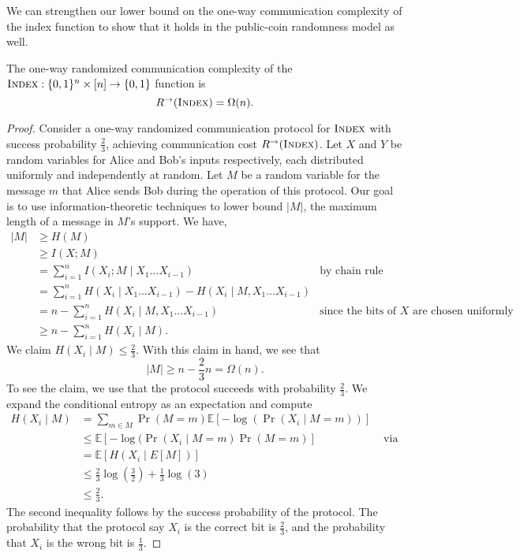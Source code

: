 We can strengthen our lower bound on the one-way communication complexity of the index function to show that it holds in the public-coin randomness model as well.

\begin{theorem}
The one-way randomized communication complexity of the $\textsc{Index} : \{0,1\}^n \times [n] \to \{0,1\}$ function is
\[
R^\rightarrow(\textsc{Index}) = \Omega(n).
\]
\end{theorem}

\begin{proof}
Consider a one-way randomized communication protocol for $\textsc{Index}$ with success probability $\frac{2}{3}$, achieving communication cost $R^\rightarrow(\textsc{Index})$. Let $X$ and $Y$ be random variables for Alice and Bob's inputs respectively, each distributed uniformly and independently at random. Let $M$ be a random variable for the message $m$ that Alice sends Bob during the operation of this protocol. Our goal is to use information-theoretic techniques to lower bound $|M|$, the maximum length of a message in $M$'s support. We have,
\begin{align*}
|M| &\geq H(M)\\
&\geq I(X;M) \\
&=\sum_{i=1}^n I(X_i; M \mid X_1\dots X_{i-1}) &\text{by chain rule} \\
&=\sum_{i=1}^n H(X_i\mid X_1\dots X_{i-1}) - H(X_i\mid M, X_1\dots X_{i-1})\\
&= n - \sum_{i=1}^n H(X_i\mid M, X_1\dots X_{i-1}) &\text{since the bits of $X$ are chosen uniformly independently} \\
&\geq n-\sum_{i=1}^n H(X_i\mid M).
\end{align*} 
We claim $H(X_i\mid M)\leq \frac{2}{3}$. With this claim in hand, we see that
$$|M| \geq n-\frac{2}{3}n =\Omega(n).$$
To see the claim, we use that the protocol succeeds with probability $\frac{2}{3}$. We expand the conditional entropy as an expectation and compute
\begin{align*}
	H(X_i\mid M) &= \sum_{m \in M} \Pr(M=m)\mathbb{E}[-\log(\Pr(X_i\mid M=m))]\\
	&\leq \mathbb{E}[-\log(\Pr(X_i\mid M=m)\Pr(M=m)] &\text{ via Jensen's inequality}\\
	&= \mathbb{E}[H(X_i\mid E[M])]\\
	&\leq \frac{2}{3}\log\left(\frac{3}{2}\right) + \frac{1}{3}\log(3)\\
	&\leq \frac{2}{3}.
\end{align*}
The second inequality follows by the success probability of the protocol. The probability that the protocol say $X_i$ is the correct bit is $\frac{2}{3}$, and the probability that $X_i$ is the wrong bit is $\frac{1}{3}$.
\end{proof}



